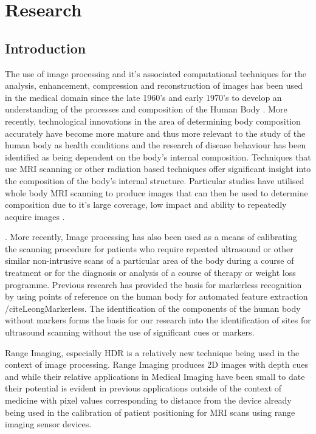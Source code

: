 \chapter{Research}

\label{research}

\section{Introduction}

The use of image processing and it's associated computational techniques for the analysis, enhancement, compression and reconstruction of images has been used in the medical domain since the late 1960's and early 1970's to develop an understanding of the processes and composition of the Human Body \cite{HansonHistory}. More recently, technological innovations in the area of determining body composition accurately have become more mature \cite{WeyersBodpod} and thus more relevant to the study of the human body as health conditions and the research of disease behaviour has been identified as being dependent on the body's internal composition. Techniques that use MRI scanning or other radiation based techniques offer significant insight into the composition of the body's internal structure. Particular studies have utilised whole body MRI scanning to produce images that can then be used to determine composition due to it's large coverage, low impact and ability to repeatedly acquire images \cite{KullbergMRI}. 

\cite{SteinkampComposition}. More recently, Image processing has also been used as a means of calibrating the scanning procedure for patients who require repeated ultrasound or other similar non-intrusive scans of a particular area of the body during a course of treatment or for the diagnosis or analysis of a course of therapy or weight loss programme. Previous research has provided the basis for markerless recognition by using points of reference on the human body for automated feature extraction /cite{LeongMarkerless}. The identification of the components of the human body without markers forms the basis for our research into the identification of sites for ultrasound scanning without the use of significant cues or markers.

Range Imaging, especially HDR is a relatively new technique being used in the context of image processing. Range Imaging produces 2D images with depth cues and while their relative applications in Medical Imaging have been small to date their potential is evident in previous applications outside of the context of medicine with pixel values corresponding to distance from the device already being used in the calibration of patient positioning for MRI scans using range imaging sensor devices.

